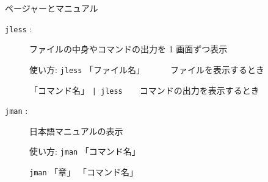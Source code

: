 \begin{center}
\begin{minipage}{13cm}
\begin{itembox}[l]{ページャーとマニュアル}
\begin{description}
\item[\texttt{jless} :] ファイルの中身やコマンドの出力を 1 画面ずつ表示

使い方: \texttt{jless} 「ファイル名」~~~~~~ファイルを表示するとき

\hspace*{1.25cm}「コマンド名」 \texttt{| jless}~~~~コマンドの出力を表示するとき

\item[\texttt{jman} :] 日本語マニュアルの表示

使い方: \texttt{jman} 「コマンド名」

\hspace*{1.25cm} \texttt{jman} 「章」 「コマンド名」
\end{description}
\end{itembox}
\end{minipage}
\end{center}
